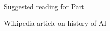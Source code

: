 \begin{frame}{Suggested reading for Part \thispart}

\begin{itemize}
{\scriptsize
\item Wikipedia article on history of AI \cite{Wikipedia:HistoryOfAI}
}
\end{itemize}

\end{frame}

